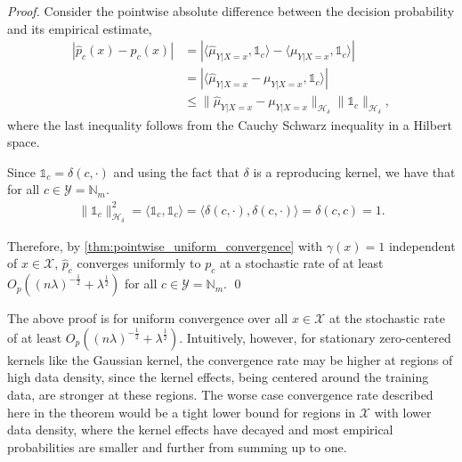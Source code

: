 \documentclass[runningheads, envcountsame, a4paper]{llncs}
\begin{document}
		\begin{proof}
			Consider the pointwise absolute difference between the decision probability and its empirical estimate,			
			\begin{equation}
			\begin{aligned}
				| \hat{p}_{c}(x) - p_{c}(x) | &= | \langle \hat{\mu}_{Y | X = x}, \mathbb{1}_{c} \rangle - \langle \mu_{Y | X = x}, \mathbb{1}_{c} \rangle | \\
				&= | \langle \hat{\mu}_{Y | X = x} - \mu_{Y | X = x}, \mathbb{1}_{c} \rangle | \\
				&\leq \big\| \hat{\mu}_{Y | X = x} - \mu_{Y | X = x} \big\|_{\mathcal{H}_{\delta}} \big\| \mathbb{1}_{c} \big\|_{\mathcal{H}_{\delta}},
			\label{eq:decision_probability_error_upper_bound}
			\end{aligned}
			\end{equation}
			where the last inequality follows from the Cauchy Schwarz inequality in a Hilbert space.
			
			Since $\mathbb{1}_{c} = \delta(c, \cdot)$ and using the fact that $\delta$ is a reproducing kernel, we have that for all $c \in \mathcal{Y} = \mathbb{N}_{m}$.
			\begin{equation}
			\begin{aligned}
				\big\| \mathbb{1}_{c} \big\|_{\mathcal{H}_{\delta}}^{2} = \langle \mathbb{1}_{c}, \mathbb{1}_{c} \rangle = \langle \delta(c, \cdot), \delta(c, \cdot) \rangle = \delta(c, c) = 1.
				\label{eq:indicator_RKHS_norm}
			\end{aligned}
			\end{equation}
			
			Therefore, by \cref{thm:pointwise_uniform_convergence} with $\gamma(x) = 1$ independent of $x \in \mathcal{X}$, $\hat{p}_{c}$ converges uniformly to $p_{c}$ at a stochastic rate of at least $O_{p}((n \lambda)^{-\frac{1}{2}} + \lambda^{\frac{1}{2}})$ for all $c \in \mathcal{Y} = \mathbb{N}_{m}$.
			\qed
		\end{proof}
	
		The above proof is for uniform convergence over all $x \in \mathcal{X}$ at the stochastic rate of at least $O_{p}((n \lambda)^{-\frac{1}{2}} + \lambda^{\frac{1}{2}})$. Intuitively, however, for stationary zero-centered kernels like the Gaussian kernel, the convergence rate may be higher at regions of high data density, since the kernel effects, being centered around the training data, are stronger at these regions. The worse case convergence rate described here in the theorem would be a tight lower bound for regions in $\mathcal{X}$ with lower data density, where the kernel effects have decayed and most empirical probabilities are smaller and further from summing up to one.
		
\end{document}
